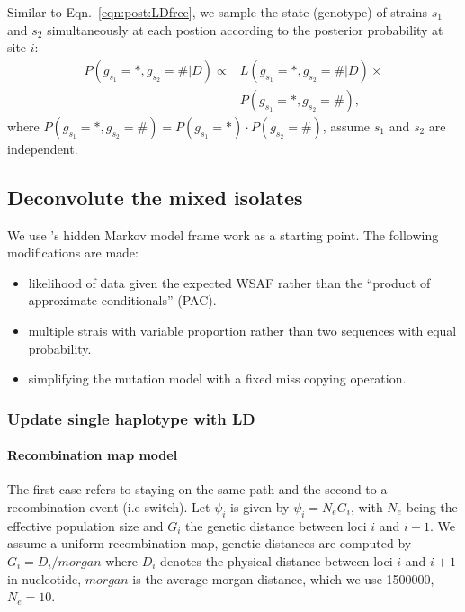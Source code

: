 \documentclass{bioinfo}
\begin{document}
\begin{methods}
Similar to Eqn.~\eqref{eqn:post:LDfree}, we sample the state (genotype) of strains $s_1$ and $s_2$ simultaneously at each postion according to the posterior probability at site $i$:
\begin{equation}
\begin{split}
P(g_{s_1}=*,g_{s_2}=\#  | D) \propto & L(g_{s_1}=*,g_{s_2}=\# |D) \times \\
                                     & P(g_{s_1}=*,g_{s_2}=\# ),\label{eqn:post.two:LDfree}
\end{split}
\end{equation}
where $P(g_{s_1}=*,g_{s_2}=\# ) = P(g_{s_1}=*) \cdot P(g_{s_2}=\# )$, assume $s_1$ and $s_2$ are independent. %




\subsection{Deconvolute the mixed isolates}

We use \citet{Li2003}'s hidden Markov model frame work as a starting point. The following modifications are made:
\begin{itemize}
\item likelihood of data given the expected WSAF rather than the ``product of approximate conditionals'' (PAC).
\item multiple strais with variable proportion rather than two sequences with equal probability.
\item simplifying the mutation model with a fixed miss copying operation.
\end{itemize}

\subsubsection{Update single haplotype with LD}

\paragraph{Recombination map model}

The first case refers to staying on the same path and the second to a recombination event (i.e switch).
Let $\psi_i$ is given by $\psi_i = N_e G_i$, with $N_e$ being the effective population size and $G_i$ the genetic distance between loci $i$ and $i+1$. We assume a uniform recombination map, genetic distances are computed by
$G_i = D_i / morgan$
where $D_i$ denotes the physical distance between loci $i$ and $i+1$ in nucleotide, $morgan$ is the average morgan distance, which we use 1500000, $N_e = 10$.


\end{methods}
\end{document}
